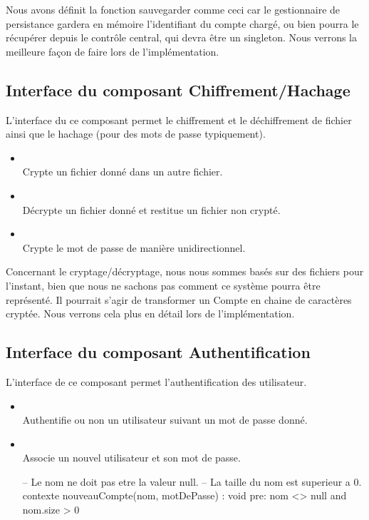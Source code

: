 Nous avons définit la fonction sauvegarder comme ceci car le gestionnaire de persistance gardera en mémoire l'identifiant du compte chargé, ou bien pourra le récupérer depuis le contrôle central, qui devra être un singleton.
Nous verrons la meilleure façon de faire lors de l'implémentation.

	\subsection{Interface du composant Chiffrement/Hachage}

	L'interface du ce composant permet le chiffrement et le déchiffrement de fichier ainsi que le hachage (pour des mots de passe typiquement).

		\begin{itemize}
			\item {} \\
			Crypte un fichier donné dans un autre fichier.
			\item {} \\
			Décrypte un fichier donné et restitue un fichier non crypté.
			\item {} \\
			Crypte le mot de passe de manière unidirectionnel.
		\end{itemize}

Concernant le cryptage/décryptage, nous nous sommes basés sur des fichiers pour l'instant, bien que nous ne sachons pas comment ce système pourra être représenté.
Il pourrait s'agir de transformer un Compte en chaine de caractères cryptée.
Nous verrons cela plus en détail lors de l'implémentation.

	\subsection{Interface du composant Authentification}

	L'interface de ce composant permet l'authentification des utilisateur.

		\begin{itemize}
			\item {} \\
			Authentifie ou non un utilisateur suivant un mot de passe donné.
			\item {} \\
			Associe un nouvel utilisateur et son mot de passe.
			\begin{ocl}
-- Le nom ne doit pas etre la valeur null.
-- La taille du nom est superieur a 0.
contexte nouveauCompte(nom, motDePasse) : void
pre: nom <> null
	and nom.size > 0
			\end{ocl}
		\end{itemize}


